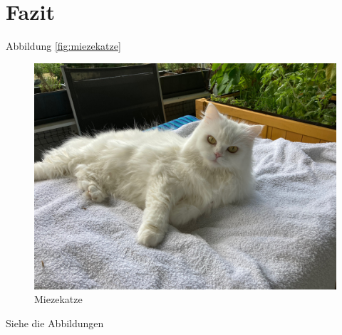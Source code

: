 \documentclass[12pt,ngerman,parskip=half]{scrartcl}
\begin{document}

\section{Fazit}\label{sec:fazit}

\blindtext


Abbildung \vref{fig:miezekatze}


\begin{figure}[h]
\includegraphics[width=\textwidth]{./Bilder/Katze1}
\caption{Miezekatze}\label{fig:miezekatze3}
\end{figure}

Siehe die Abbildungen 
\end{document}
